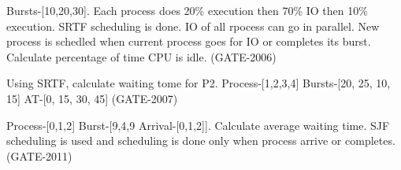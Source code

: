 \begin{minipage}{\linewidth}

  \question  Bursts-[10,20,30]. Each process does 20\% execution then 70\% IO then 10\% execution.
             SRTF scheduling is done. IO of all rpocess can go in parallel. New process is
             schedled when current process goes for IO or completes its burst.
             Calculate percentage of time CPU is idle. (GATE-2006)

  \begin{oneparchoices}
  \end{oneparchoices}

  \end{minipage}

\vspace{0.08in}



\begin{minipage}{\linewidth}

  \question Using SRTF, calculate waiting tome for P2.
            Process-[1,2,3,4] Bursts-[20, 25, 10, 15] AT-[0, 15, 30, 45] (GATE-2007)

  \begin{oneparchoices}
  \end{oneparchoices}

  \end{minipage}

\vspace{0.08in}


\begin{minipage}{\linewidth}

  \question  Process-[0,1,2] Burst-[9,4,9 Arrival-[0,1,2]]. Calculate average waiting time.
             SJF scheduling is used and scheduling is done only when process arrive or completes. (GATE-2011)

  \begin{oneparchoices}
  \end{oneparchoices}

\end{minipage}

\vspace{0.08in}

